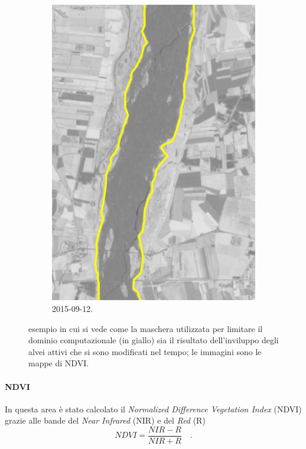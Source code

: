 \begin{figure}[t]
\begin{subfigure}[b]{0.4\textwidth}
	\end{subfigure}
	\qquad
	\begin{subfigure}[b]{0.4\textwidth}
		\includegraphics[width=\textwidth]{files/esempio_mask_2015_09_12.jpeg}
		\caption{\Se{} 2015-09-12.}
	\end{subfigure}
	\caption[definizione della maschera per limitare il dominio computazionale]
		{esempio in cui si vede come la maschera utilizzata per limitare il dominio computazionale (in giallo) sia il risultato dell'inviluppo degli alvei attivi che si sono modificati nel tempo; le immagini sono le mappe di NDVI.}
	\label{fig:esempio-maschera}
\end{figure}
%
%
\paragraph{NDVI} 
In questa area è stato calcolato il \emph{Normalized Difference Vegetation Index} (NDVI) grazie alle bande del \emph{Near Infrared} (NIR) e del \emph{Red} (R)
%
\begin{equation}
	NDVI = \frac{NIR - R}{NIR + R} \quad .
	\label{eq:ndvi}
\end{equation}
%
%
